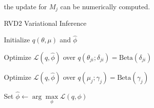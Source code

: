 \documentclass[11pt,reqno]{amsart}
\begin{document}
the update for $ M_j $ can be numerically computed.

\begin{algorithm}[ht]
  \caption{RVD2 Variational Inference}
  \label{alg:rvd2_vi}
  \begin{algorithmic}[1]

  \State Initialize $ q(\theta, \mu) $ and $\hat{\phi}$

  \Repeat
  
	\Repeat
	
			\State Optimize $\mathcal{L}(q, \hat{\phi})$ over $q(\theta_{ji}; \delta_{ji}) = \text{Beta} (\delta_{ji})$				
			\EndFor			
		\EndFor
		
	
			\State Optimize $\mathcal{L}(q, \hat{\phi})$ over $q(\mu_j; \gamma_j) = \text{Beta} (\gamma_j)$			                  
		\EndFor
	

  \State Set $\hat{\phi} \leftarrow \arg \max\limits_{\phi}
            \mathcal{L}(q,\phi)$

  \end{algorithmic}
  
\end{algorithm}




\appendix

%
%
\end{document}
